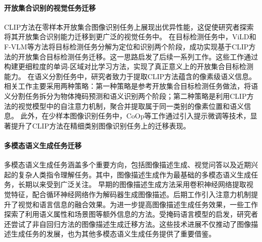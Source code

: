 \paragraph{开放集合识别的视觉任务迁移}
CLIP方法在零样本开放集合图像识别任务上展现出优异性能，这促使研究者探索将其开放集合识别能力迁移到更广泛的视觉任务中。
在目标检测任务中，ViLD\cite{ViLD}和F-VLM\cite{F-VLM}等方法将目标检测任务分解为定位和识别两个阶段，成功实现基于CLIP方法的开放集合目标检测任务迁移。这一思路启发了后续一系列工作\cite{Zhong_2022_CVPR, glip, detclip, detclip-2, detclip-3}。这些工作通过构建更细粒度的单词-区域对比学习方法，实现了真正意义上的开放集合目标检测能力。
在语义分割任务中，研究者致力于提取CLIP方法蕴含的像素级语义信息。相关工作\cite{denseclip, zsseg, openseg}主要采用两种策略：第一种策略是参考开放集合目标检测任务做法，将语义分割任务拆分为物体掩码预测和语义识别两个阶段；第二种策略是利用CLIP方法的视觉模型中的自注意力机制，聚合并提取属于同一类别的像素位置和语义信息。
此外，在少样本图像识别任务中，CoOp等工作\cite{coop,cocoop}通过引入提示微调等技术，显著提升了CLIP方法在精细类别图像识别任务上的迁移表现。


\paragraph{多模态语义生成任务迁移}
多模态语义生成任务涵盖多个重要方向，包括图像描述生成\cite{vinyals2015show,karpathy2015deep}、视觉问答\cite{vqa}以及近期兴起的复杂人类指令理解任务\cite{llava}。其中，图像描述生成作为最基础的多模态语义生成任务，长期以来受到广泛关注。
早期的图像描述生成方法\cite{vinyals2015show,karpathy2015deep}采用卷积神经网络提取视觉特征，配合循环神经网络作为解码器生成图像描述。后期工作引入注意力机制提升了视觉和语言信息的融合效果\cite{huang2019attention,lu2017knowing}。为进一步提高图像描述生成任务效果，一些工作探索了利用语义属性\cite{yao2017boosting}和场景图\cite{yang2019auto}等额外信息的方法。受掩码语言模型的启发，研究者还尝试了非自回归方法\cite{gao2019masked}的图像描述生成迁移方法。这些技术进展不仅推动了图像描述生成任务的发展，也为其他多模态语义生成任务提供了重要借鉴。

